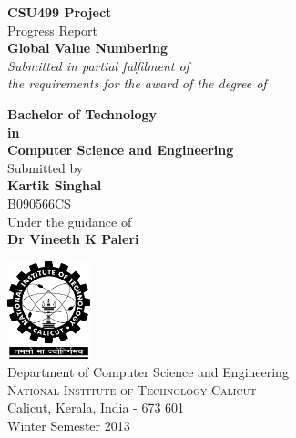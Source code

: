 \begin{titlepage}

\begin{center}

\textup{\small {\bf CSU499 Project} \\ Progress Report}\\[0.4in]

\Large \textbf {Global Value Numbering}\\[0.5in]

       \small \emph{Submitted in partial fulfilment of\\
        the requirements for the award of the degree of}
        \vspace{.2in}

       {\bf Bachelor of Technology \\in\\ Computer Science and Engineering}\\[0.5in]

\normalsize Submitted by \\[0.2in]
\textbf {Kartik Singhal} \\ 
B090566CS\\

\vspace{.3in}
Under the guidance of\\
{\textbf{Dr Vineeth K Paleri}}\\
\vfill

\includegraphics[width=0.18\textwidth]{./nitc-logo}\\[0.2in]
\Large{Department of Computer Science and Engineering}\\
\normalsize
\textsc{National Institute of Technology Calicut}\\
Calicut, Kerala, India - 673 601 \\
\vspace{0.5cm}
Winter Semester 2013

\end{center}

\end{titlepage}
